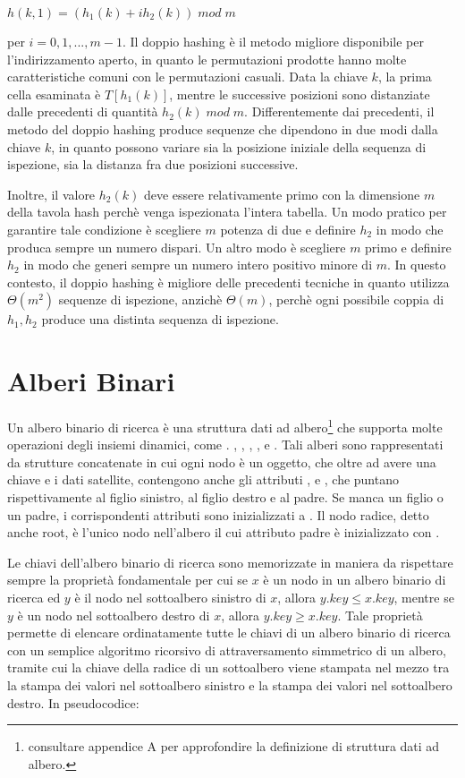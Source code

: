\(h(k,1) = (h_1(k)+ih_2(k))\;mod\;m\)

\noindent per \(i=0,1,...,m-1\). Il doppio hashing è il metodo migliore disponibile per l'indirizzamento aperto, in quanto le permutazioni prodotte hanno molte caratteristiche comuni con le permutazioni casuali. Data la chiave \(k\), la prima cella esaminata è \(T[h_1(k)]\), mentre le successive posizioni sono distanziate dalle precedenti di quantità \(h_2(k)\;mod\;m\). Differentemente dai precedenti, il metodo del doppio hashing produce sequenze che dipendono in due modi dalla chiave \(k\), in quanto possono variare sia la posizione iniziale della sequenza di ispezione, sia la distanza fra due posizioni successive. 

Inoltre, il valore \(h_2(k)\) deve essere relativamente primo con la dimensione \(m\) della tavola hash perchè venga ispezionata l'intera tabella. Un modo pratico per garantire tale condizione è scegliere \(m\) potenza di due e definire \(h_2\) in modo che produca sempre un numero dispari. Un altro modo è scegliere \(m\) primo e definire \(h_2\) in modo che generi sempre un numero intero positivo minore di \(m\). In questo contesto, il doppio hashing è migliore delle precedenti tecniche in quanto utilizza \(\Theta(m^2)\) sequenze di ispezione, anzichè \(\Theta(m)\), perchè ogni possibile coppia di \(h_1, h_2\) produce una distinta sequenza di ispezione.

\section{Alberi Binari}
Un albero binario di ricerca è una struttura dati ad albero\footnote{consultare appendice A per approfondire la definizione di struttura dati ad albero.} che supporta molte operazioni degli insiemi dinamici, come . , , , ,  e . Tali alberi sono rappresentati da strutture concatenate in cui ogni nodo è un oggetto, che oltre ad avere una chiave e i dati satellite, contengono anche gli attributi ,  e , che puntano rispettivamente al figlio sinistro, al figlio destro e al padre. Se manca un figlio o un padre, i corrispondenti attributi sono inizializzati a . Il nodo radice, detto anche root, è l'unico nodo nell'albero il cui attributo padre è inizializzato con .

Le chiavi dell'albero binario di ricerca sono memorizzate in maniera da rispettare sempre la proprietà fondamentale per cui se \(x\) è un nodo in un albero binario di ricerca ed \(y\) è il nodo nel sottoalbero sinistro di \(x\), allora \(y.key \le x.key\), mentre se \(y\) è un nodo nel sottoalbero destro di \(x\), allora \(y.key \ge x.key\). Tale proprietà permette di elencare ordinatamente tutte le chiavi di un albero binario di ricerca con un semplice algoritmo ricorsivo di attraversamento simmetrico di un albero, tramite cui la chiave della radice di un sottoalbero viene stampata nel mezzo tra la stampa dei valori nel sottoalbero sinistro e la stampa dei valori nel sottoalbero destro. In pseudocodice:

